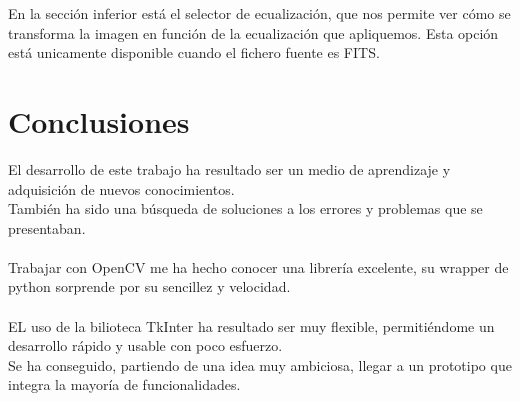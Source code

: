 \begin{itemize}
\begin{figure}[!htb]
				\caption{\label{fig:BarraDerecha}}
			\end{figure}
		En la sección inferior está el selector de ecualización, que nos permite ver cómo se transforma la imagen en función de la ecualización que apliquemos. Esta opción está unicamente disponible cuando el fichero fuente es FITS.
		
	\end{itemize}

	\newpage
	\section{Conclusiones}
	El desarrollo de este trabajo ha resultado ser un medio de aprendizaje y
	adquisición de nuevos conocimientos.\\
	También ha sido una búsqueda de soluciones a los errores y problemas que se presentaban.\\ \\
	Trabajar con OpenCV me ha hecho conocer una librería excelente, su wrapper de python sorprende por su sencillez y velocidad.\\ \\
	EL uso de la bilioteca TkInter ha resultado ser muy flexible, permitiéndome un desarrollo rápido y usable con poco esfuerzo.\\
	Se ha conseguido, partiendo de una idea muy ambiciosa, llegar a un prototipo que integra la mayoría de funcionalidades.
	\\
	\newline

